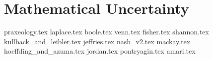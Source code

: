\part{Mathematical Uncertainty}

{praxeology.tex}
{laplace.tex}
{boole.tex}
{venn.tex}
{fisher.tex}
{shannon.tex}
{kullback_and_leibler.tex}
{jeffries.tex}
{nash_v2.tex}
{mackay.tex}
{hoeffding_and_azuma.tex}
{jordan.tex}
{pontryagin.tex}  
{amari.tex}